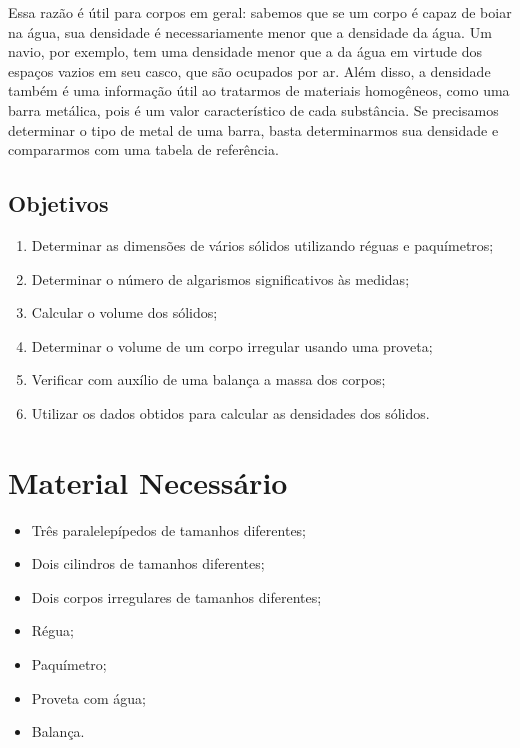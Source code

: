 Essa razão é útil para corpos em geral: sabemos que se um corpo é capaz de boiar na água, sua densidade é necessariamente menor que a densidade da água. Um navio, por exemplo, tem uma densidade menor que a da água em virtude dos espaços vazios em seu casco, que são ocupados por ar. Além disso, a densidade também é uma informação útil ao tratarmos de materiais homogêneos, como uma barra metálica, pois é um valor característico de cada substância. Se precisamos determinar o tipo de metal de uma barra, basta determinarmos sua densidade e compararmos com uma tabela de referência.

\subsection{Objetivos}

\begin{enumerate}
     \item Determinar as dimensões de vários sólidos utilizando réguas e paquímetros;
     \item Determinar o número de algarismos significativos às medidas;
     \item Calcular o volume dos sólidos;
     \item Determinar o volume de um corpo irregular usando uma proveta;
     \item Verificar com auxílio de uma balança a massa dos corpos;
     \item Utilizar os dados obtidos para calcular as densidades dos sólidos.
\end{enumerate}

\section{Material Necessário}

\begin{itemize}
	\item Três paralelepípedos de tamanhos diferentes;
	\item Dois cilindros de tamanhos diferentes;
	\item Dois corpos irregulares de tamanhos diferentes;
	\item Régua;
	\item Paquímetro;
	\item Proveta com água;
	\item Balança.
\end{itemize}

